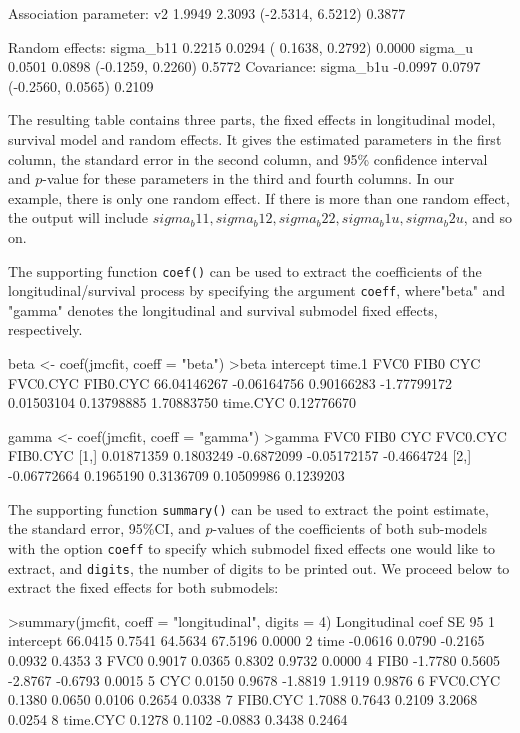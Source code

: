 \begin{example}
Association parameter:
  v2             1.9949       2.3093      (-2.5314, 6.5212)      0.3877

Random effects:
  sigma_b11      0.2215       0.0294      ( 0.1638, 0.2792)      0.0000
  sigma_u        0.0501       0.0898      (-0.1259, 0.2260)      0.5772
 Covariance:
  sigma_b1u      -0.0997      0.0797      (-0.2560, 0.0565)      0.2109
\end{example}

The resulting table contains three parts, the fixed effects in longitudinal model, survival model and random effects. It gives the estimated parameters in the first column, the standard error in the second column, and 95\% confidence interval and $p$-value for these parameters in the third and fourth columns. In our example, there is only one random effect. If there is more than one random effect, the output will include
$sigma_b11, sigma_b12, sigma_b22, sigma_b1u, sigma_b2u$, and so on.

The supporting function \texttt{coef()} can be used to extract the coefficients of the longitudinal/survival process by specifying the argument \texttt{coeff}, where"beta" and "gamma" denotes the longitudinal and survival submodel fixed effects, respectively.

\begin{example}
beta <- coef(jmcfit, coeff = "beta")
>beta
  intercept      time.1        FVC0        FIB0         CYC    FVC0.CYC    FIB0.CYC
66.04146267 -0.06164756  0.90166283 -1.77799172  0.01503104  0.13798885  1.70883750
   time.CYC
 0.12776670

gamma <- coef(jmcfit, coeff = "gamma")
>gamma
            FVC0      FIB0        CYC    FVC0.CYC   FIB0.CYC
[1,]  0.01871359 0.1803249 -0.6872099 -0.05172157 -0.4664724
[2,] -0.06772664 0.1965190  0.3136709  0.10509986  0.1239203

\end{example}

The supporting function \texttt{summary()} can be used to extract the point estimate, the standard error, 95\%CI, and $p$-values of the coefficients of both sub-models with the option \texttt{coeff} to specify which submodel fixed effects one would like to extract, and \texttt{digits}, the number of digits to be printed out. We proceed below to extract the fixed effects for both submodels:

\begin{example}
>summary(jmcfit, coeff = "longitudinal", digits = 4)
  Longitudinal    coef     SE 95%
1    intercept  66.0415 0.7541  64.5634  67.5196   0.0000
2         time  -0.0616 0.0790  -0.2165   0.0932   0.4353
3         FVC0   0.9017 0.0365   0.8302   0.9732   0.0000
4         FIB0  -1.7780 0.5605  -2.8767  -0.6793   0.0015
5          CYC   0.0150 0.9678  -1.8819   1.9119   0.9876
6     FVC0.CYC   0.1380 0.0650   0.0106   0.2654   0.0338
7     FIB0.CYC   1.7088 0.7643   0.2109   3.2068   0.0254
8     time.CYC   0.1278 0.1102  -0.0883   0.3438   0.2464
\end{example}

